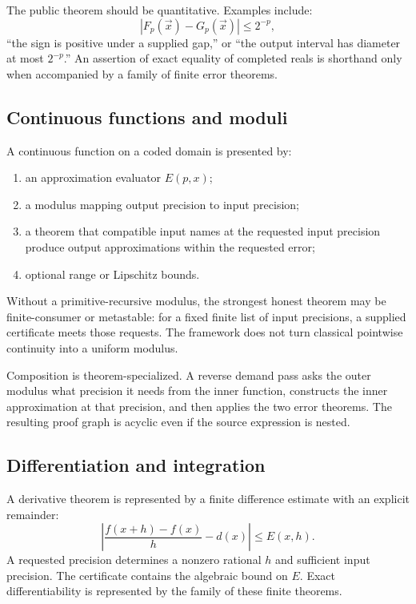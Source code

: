 The public theorem should be quantitative.  Examples include:
\[
 |F_p(\vec x)-G_p(\vec x)|\le 2^{-p},
\]
``the sign is positive under a supplied gap,'' or ``the output interval has diameter at most
\(2^{-p}\).''  An assertion of exact equality of completed reals is shorthand only when accompanied
by a family of finite error theorems.

\subsection{Continuous functions and moduli}

A continuous function on a coded domain is presented by:

\begin{enumerate}
\item an approximation evaluator \(E(p,x)\);
\item a modulus mapping output precision to input precision;
\item a theorem that compatible input names at the requested input precision produce output
      approximations within the requested error;
\item optional range or Lipschitz bounds.
\end{enumerate}

Without a primitive-recursive modulus, the strongest honest theorem may be finite-consumer or
metastable: for a fixed finite list of input precisions, a supplied certificate meets those requests.
The framework does not turn classical pointwise continuity into a uniform modulus.

Composition is theorem-specialized.  A reverse demand pass asks the outer modulus what precision it
needs from the inner function, constructs the inner approximation at that precision, and then applies
the two error theorems.  The resulting proof graph is acyclic even if the source expression is nested.

\subsection{Differentiation and integration}

A derivative theorem is represented by a finite difference estimate with an explicit remainder:
\[
  \left|\frac{f(x+h)-f(x)}{h}-d(x)\right|\le E(x,h).
\]
A requested precision determines a nonzero rational \(h\) and sufficient input precision.  The
certificate contains the algebraic bound on \(E\).  Exact differentiability is represented by the
family of these finite theorems.

